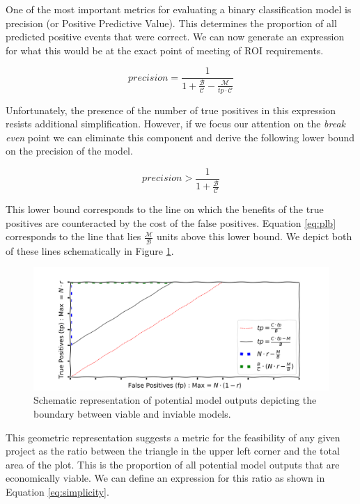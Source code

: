 \documentclass[12pt,a4paper]{article}
\numberwithin{equation}{section}
\begin{document}
One of the most important metrics for evaluating a binary classification model is precision (or Positive Predictive Value). This determines
the proportion of all predicted positive events that were correct. We can now generate an expression for what this would
be at the exact point of meeting of ROI requirements. 

\begin{equation}
\label{eq:plb}
precision = \frac{1}{1 + \frac{\mathcal{B}}{\mathcal{C}} - \frac{\mathcal{M}}{tp \cdot \mathcal{C}}}
\end{equation}

Unfortunately, the presence of the number of true positives in this expression resists additional simplification.
However, if we focus our attention on the \textit{break even} point we can eliminate this component and derive the
following lower bound on the precision of the model.


\begin{equation}
precision > \frac{1}{1 + \frac{\mathcal{B}}{\mathcal{C}} }
\end{equation}

This lower bound corresponds to the line on which the benefits of the true positives are counteracted by the cost of the false positives.
Equation \ref{eq:plb} corresponds to the line that lies $\frac{\mathcal{M}}{\mathcal{B}}$ units above this lower bound.
We depict both of these lines schematically in Figure \ref{fig:simplicity}.

\begin{figure}[h!]
\includegraphics[scale=0.5]{images/simplicity.png}
\caption{Schematic representation of potential model outputs depicting the boundary between viable and inviable models.}
\label{fig:simplicity}
\end{figure}

This geometric representation suggests a metric for the feasibility of any given project
as the ratio between the triangle in the upper left corner and the total area of the plot. This is the proportion of all potential
model outputs that are economically viable. 
We can define an expression for this ratio as shown in Equation \ref{eq:simplicity}.
\end{document}
